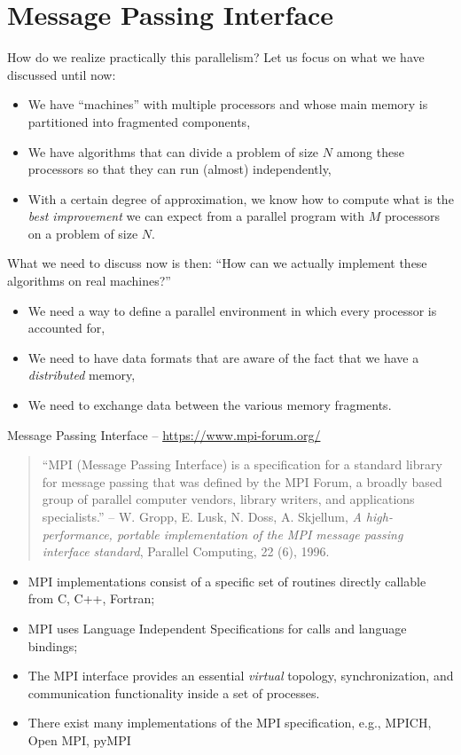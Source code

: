 \documentclass[xcolor={svgnames,usenames}]{beamer}
\begin{document}
\section{Message Passing Interface}

\begin{frame}{How do we realize practically this parallelism?}
Let us focus on what we have discussed until now:
\begin{itemize}
	\item We have ``machines'' with multiple processors and whose main memory is partitioned into fragmented components,
	\item We have algorithms that can divide a problem of size $N$ among these processors so that they can run (almost) independently,
	\item With a certain degree of approximation, we know how to compute what is the \emph{best improvement} we can expect from a parallel program with $M$ processors on a problem of size $N$.
\end{itemize}
What we need to discuss now is then: ``How can we actually implement these algorithms on real machines?''
\begin{itemize}
	\item We need a way to define a parallel environment in which every processor is accounted for,
	\item We need to have data formats that are aware of the fact that we have a \emph{distributed} memory,
	\item We need to exchange data between the various memory fragments.
\end{itemize}
\end{frame}
%
\begin{frame}{Message Passing Interface -- \url{https://www.mpi-forum.org/}}

\begin{quote}
	``MPI (Message Passing Interface) is a \alert{specification for a standard library} for message passing that was defined by the MPI Forum, a broadly based group of parallel computer vendors, library writers, and applications specialists.'' -- W. Gropp, E. Lusk, N. Doss, A. Skjellum,
	\emph{A high-performance, portable implementation of the MPI message passing interface standard}, Parallel Computing, 22 (6), 1996.
\end{quote}

\begin{itemize}
	\item<2-> MPI implementations consist of a specific set of routines directly callable from C, C++, Fortran;
	\item<3-> MPI uses Language Independent Specifications for calls and language bindings;
	\item<4-> The MPI interface provides an essential \emph{virtual} topology, synchronization, and communication functionality inside a set of processes.
	\item<5-> There exist many implementations of the MPI specification, e.g., MPICH, Open MPI, pyMPI
\end{itemize}
\end{frame}
\end{document}
